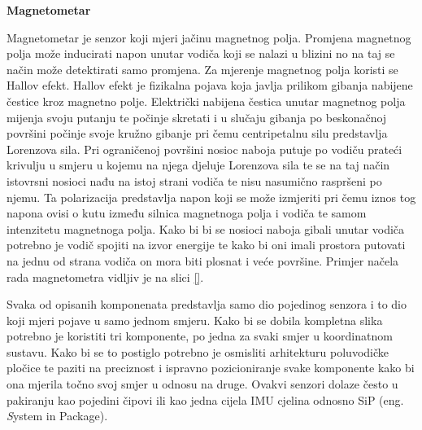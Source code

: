 \documentclass[times, utf8, diplomski]{fer}
\begin{document}
\textbf{Magnetometar}

Magnetometar je senzor koji mjeri jačinu magnetnog polja. Promjena magnetnog polja može
inducirati napon unutar vodiča koji se nalazi u blizini no na taj se način može detektirati samo promjena. Za mjerenje magnetnog
polja koristi se Hallov efekt. Hallov efekt je fizikalna pojava koja javlja prilikom gibanja nabijene čestice kroz magnetno polje.
Električki nabijena čestica unutar magnetnog polja mijenja svoju putanju te počinje skretati i u slučaju gibanja po beskonačnoj
površini počinje svoje kružno gibanje pri čemu centripetalnu silu predstavlja Lorenzova sila. Pri ograničenoj površini nosioc
naboja putuje po vodiču prateći krivulju u smjeru u kojemu na njega djeluje Lorenzova sila te se na taj način istovrsni nosioci
nađu na istoj strani vodiča te nisu nasumično raspršeni po njemu. Ta polarizacija predstavlja napon koji se može izmjeriti pri
čemu iznos tog napona ovisi o kutu između silnica magnetnoga polja i vodiča te samom intenzitetu magnetnoga polja. Kako bi bi se 
nosioci naboja gibali unutar vodiča potrebno je vodič spojiti na izvor energije te kako bi oni imali prostora putovati na 
jednu od strana vodiča on mora biti plosnat i veće površine. Primjer načela rada magnetometra vidljiv je na slici \ref{}.


Svaka od opisanih komponenata predstavlja samo dio pojedinog senzora i to dio koji mjeri pojave u samo jednom smjeru. Kako bi se
dobila kompletna slika potrebno je koristiti tri komponente, po jedna za svaki smjer u koordinatnom sustavu. Kako bi se to postiglo
potrebno je osmisliti arhitekturu poluvodičke pločice te paziti na preciznost i ispravno pozicioniranje svake komponente kako bi
ona mjerila točno svoj smjer u odnosu na druge. Ovakvi senzori dolaze često u pakiranju kao pojedini čipovi ili kao jedna cijela
IMU cjelina odnosno SiP (eng. \textit System in Package).
\end{document}
